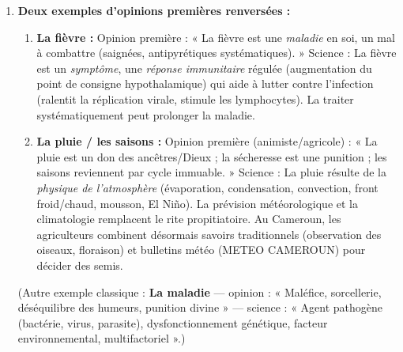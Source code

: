 \documentclass[11pt]{article}
\begin{document}
\begin{corrige}
\begin{enumerate}
\item \textbf{Deux exemples d'opinions premières renversées :}
\begin{enumerate}
\item \textbf{La fièvre :} Opinion première : « La fièvre est une \emph{maladie} en soi, un mal à combattre (saignées, antipyrétiques systématiques). » Science : La fièvre est un \emph{symptôme}, une \emph{réponse immunitaire} régulée (augmentation du point de consigne hypothalamique) qui aide à lutter contre l'infection (ralentit la réplication virale, stimule les lymphocytes). La traiter systématiquement peut prolonger la maladie.
\item \textbf{La pluie / les saisons :} Opinion première (animiste/agricole) : « La pluie est un don des ancêtres/Dieux ; la sécheresse est une punition ; les saisons reviennent par cycle immuable. » Science : La pluie résulte de la \emph{physique de l'atmosphère} (évaporation, condensation, convection, front froid/chaud, mousson, El Niño). La prévision météorologique et la climatologie remplacent le rite propitiatoire. Au Cameroun, les agriculteurs combinent désormais savoirs traditionnels (observation des oiseaux, floraison) et bulletins météo (METEO CAMEROUN) pour décider des semis.
\end{enumerate}
(Autre exemple classique : \textbf{La maladie} — opinion : « Maléfice, sorcellerie, déséquilibre des humeurs, punition divine » — science : « Agent pathogène (bactérie, virus, parasite), dysfonctionnement génétique, facteur environnemental, multifactoriel ».)


\end{enumerate}
\end{corrige}
\end{document}

